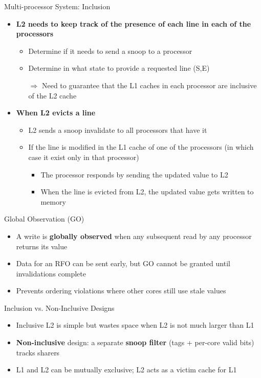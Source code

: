 \documentclass[aspectratio=169,12pt]{beamer}
\begin{document}
\begin{frame}{Multi-processor System: Inclusion}
  \begin{itemize}
    \item \textbf{L2 needs to keep track of the presence of each line in each of the processors}
    \begin{itemize}
      \item Determine if it needs to send a snoop to a processor
      \item Determine in what state to provide a requested line (S,E)
      \item[$\Rightarrow$] Need to guarantee that the L1 caches in each processor are inclusive of the L2 cache
    \end{itemize}
    \vspace{0.2cm}
    \item \textbf{When L2 evicts a line}
    \begin{itemize}
      \item L2 sends a snoop invalidate to all processors that have it
      \item If the line is modified in the L1 cache of one of the processors (in which case it exist only in that processor)
      \begin{itemize}
        \item The processor responds by sending the updated value to L2
        \item When the line is evicted from L2, the updated value gets written to memory
      \end{itemize}
    \end{itemize}
  \end{itemize}
\end{frame}

\begin{frame}{Global Observation (GO)}
\begin{itemize}
  \item A write is \textbf{globally observed} when any subsequent read by any processor returns its value
  \item Data for an RFO can be sent early, but GO cannot be granted until invalidations complete
  \item Prevents ordering violations where other cores still use stale values
\end{itemize}
\end{frame}

\begin{frame}{Inclusion vs. Non-Inclusive Designs}
\begin{itemize}
  \item Inclusive L2 is simple but wastes space when L2 is not much larger than L1
  \item \textbf{Non-inclusive} design: a separate \textbf{snoop filter} (tags + per-core valid bits) tracks sharers
  \item L1 and L2 can be mutually exclusive; L2 acts as a victim cache for L1
\end{itemize}
\end{frame}
\end{document}
